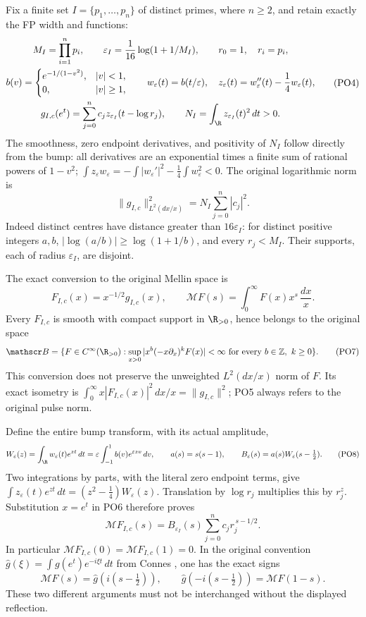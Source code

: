 \documentclass[11pt,a4paper]{article}
\theoremstyle{definition}\newtheorem{definition}[theorem]{Definition}
\begin{document}
Fix a finite set \(I=\{p_1,\ldots,p_n\}\) of distinct primes,
where \(n\ge2\), and retain exactly the FP width and functions:
\[
 \begin{gathered}
 M_I=\prod_{i=1}^np_i,\qquad
 \varepsilon_I=\frac1{16}\log(1+1/M_I),\qquad r_0=1,\quad r_i=p_i,\\
 b(v)=
 \begin{cases}e^{-1/(1-v^2)},&|v|<1,\\0,&|v|\ge1,\end{cases}
 \qquad
 w_\varepsilon(t)=b(t/\varepsilon),\quad
 z_\varepsilon(t)=w_\varepsilon''(t)-\frac14w_\varepsilon(t),\\
 g_{I,c}(e^t)=\sum_{j=0}^n c_jz_{\varepsilon_I}(t-\log r_j),
 \qquad
 N_I=\int_\R z_{\varepsilon_I}(t)^2\,dt>0 .
 \end{gathered}
 \tag{PO4}\label{PO:po:pulse}
\]
The smoothness, zero endpoint derivatives, and positivity of \(N_I\)
follow directly from the bump: all derivatives are an exponential
times a finite sum of rational powers of \(1-v^2\);
\(\int z_\varepsilon w_\varepsilon=-\int|w_\varepsilon'|^2-\tfrac14\int w_\varepsilon^2<0\).
The original logarithmic norm is
\[
 \|g_{I,c}\|_{L^2(dx/x)}^2=N_I\sum_{j=0}^n|c_j|^2 .
 \tag{PO5}\label{PO:po:norm}
\]
Indeed distinct centres have distance greater than \(16\varepsilon_I\):
for distinct positive integers \(a,b\),
\(|\log(a/b)|\ge\log(1+1/b)\), and every \(r_j<M_I\).
Their supports, each of radius \(\varepsilon_I\), are disjoint.

The exact conversion to the original Mellin space is
\[
 F_{I,c}(x)=x^{-1/2}g_{I,c}(x),\qquad
 \mathcal M F(s)=\int_0^\infty F(x)x^s\,\frac{dx}{x}.
 \tag{PO6}\label{PO:po:conversion}
\]
Every \(F_{I,c}\) is smooth with compact support in
\(\R_{>0}\), hence belongs to the original space
\[
 \mathscr B=\{F\in C^\infty(\R_{>0}):
       \sup_{x>0}|x^b(-x\partial_x)^kF(x)|<\infty
                \text{ for every }b\in\mathbb Z,\ k\ge0\}.
 \tag{PO7}
\]
This conversion does not preserve the unweighted \(L^2(dx/x)\)
norm of \(F\). Its exact isometry is
\(\int_0^\infty x|F_{I,c}(x)|^2\,dx/x=\|g_{I,c}\|^2\);
PO5 always refers to the original pulse norm.

Define the entire bump transform, with its actual amplitude,
\[
 W_\varepsilon(z)=\int_\R w_\varepsilon(t)e^{zt}\,dt
     =\varepsilon\int_{-1}^1 b(v)e^{\varepsilon zv}\,dv,\qquad
 a(s)=s(s-1),\qquad B_\varepsilon(s)=a(s)W_\varepsilon(s-\tfrac12).
 \tag{PO8}\label{PO:po:bump}
\]
Two integrations by parts, with the literal zero endpoint terms,
give \(\int z_\varepsilon(t)e^{zt}\,dt=(z^2-\tfrac14)W_\varepsilon(z)\).
Translation by \(\log r_j\) multiplies this by \(r_j^z\).
Substitution \(x=e^t\) in PO6 therefore proves
\[
 \boxed{\quad
 \mathcal M F_{I,c}(s)=B_{\varepsilon_I}(s)
             \sum_{j=0}^n c_j r_j^{\,s-1/2}.
 \quad}
 \tag{PO9}\label{PO:po:transform}
\]
In particular \(\mathcal M F_{I,c}(0)=\mathcal M F_{I,c}(1)=0\).
In the original convention
\(\widehat g(\xi)=\int g(e^t)e^{-i\xi t}\,dt\) from
Connes \cite{PO:Connes}, one has the exact signs
\[
 \mathcal M F(s)=\widehat g(i(s-\tfrac12)),\qquad
 \widehat g(-i(s-\tfrac12))=\mathcal M F(1-s).
 \tag{PO10}\label{PO:po:Fourier}
\]
These two different arguments must not be interchanged without
the displayed reflection.
\end{document}
